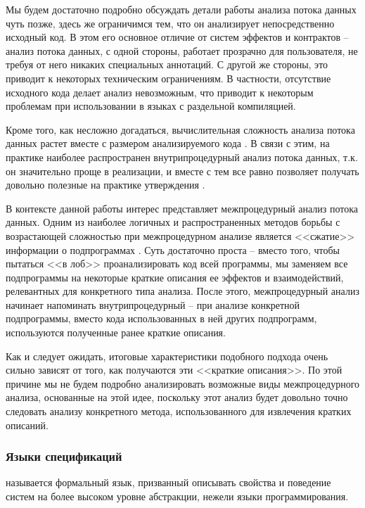 Мы будем достаточно подробно обсуждать детали работы анализа потока данных чуть позже, здесь же ограничимся тем, что он анализирует непосредственно исходный код. В этом его основное отличие от систем эффектов и контрактов -- анализ потока данных, с одной стороны, работает прозрачно для пользователя, не требуя от него никаких специальных аннотаций. С другой же стороны, это приводит к некоторых техническим ограничениям. В частности, отсутствие исходного кода делает анализ невозможным, что приводит к некоторым проблемам при использовании в языках с раздельной компиляцией.

Кроме того, как несложно догадаться, вычислительная сложность анализа потока данных растет вместе с размером анализируемого кода \cite{Sagiv96}. В связи с этим, на практике наиболее распространен внутрипроцедурный анализ потока данных, т.к. он значительно проще в реализации, и вместе с тем все равно позволяет получать довольно полезные на практике утверждения \cite{dragon-book}.

В контексте данной работы интерес представляет межпроцедурный анализ потока данных. Одним из наиболее логичных и распространенных методов борьбы с возрастающей сложностью при межпроцедурном анализе является <<сжатие>> информации о подпрограммах \cite{Weihl80, Barth78}. Суть достаточно проста -- вместо того, чтобы пытаться <<в лоб>> проанализировать код всей программы, мы заменяем все подпрограммы на некоторые краткие описания ее эффектов и взаимодействий, релевантных для конкретного типа анализа. После этого, межпроцедурный анализ начинает напоминать внутрипроцедурный -- при анализе конкретной подпрограммы, вместо кода использованных в ней других подпрограмм, используются полученные ранее краткие описания.

Как и следует ожидать, итоговые характеристики подобного подхода очень сильно зависят от того, как получаются эти <<краткие описания>>. По этой причине мы не будем подробно анализировать возможные виды межпроцедурного анализа, основанные на этой идее, поскольку этот анализ будет довольно точно следовать анализу конкретного метода, использованного для извлечения кратких описаний.




\subsubsection{Языки спецификаций}

\begin{definition}
	 называется формальный язык, призванный описывать свойства и поведение систем на более высоком уровне абстракции, нежели языки программирования.
\end{definition}

